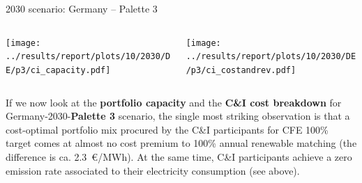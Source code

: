 \begin{frame}{2030 scenario: Germany -- Palette 3}

  {\footnotesize

  \begin{columns}
  \begin{column}{7cm}
  \centering
  \texttt{[image: ../results/report/plots/10/2030/DE/p3/ci\_capacity.pdf]}
  \end{column}

  \begin{column}{8cm}
  \centering
  \texttt{[image: ../results/report/plots/10/2030/DE/p3/ci\_costandrev.pdf]}
  \end{column}

  \end{columns}

  \begin{columns}
  \begin{column}{15cm}

    If we now look at the {\bf portfolio capacity} and the {\bf C\&I cost breakdown} 
    for Germany-2030-{\bf Palette 3} scenario, the single most striking observation is that 
    a cost-optimal portfolio mix procured by the C\&I participants for CFE 100\% target comes 
    at \alert{almost no cost premium} to 100\% annual renewable matching (the difference is ca. 2.3~\euro/MWh).
    At the same time, C\&I participants achieve a \alert{zero emission rate} associated to their 
    electricity consumption (see above).

  \end{column}
  \end{columns}
  }

\end{frame}


